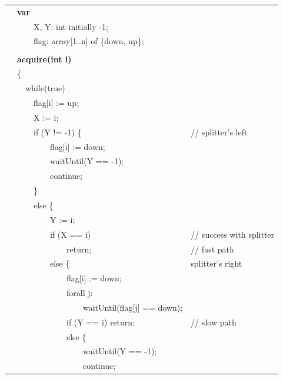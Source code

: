 \documentclass[twoside]{article}
\newcounter{magicrownumbers}
\newcommand\rownumber{\stepcounter{magicrownumbers}\arabic{magicrownumbers}}
\begin{document}
\begin{table}[!ht]
    \centering
    \begin{tabular}{l  l  l }
    \hline
        \rownumber & \textbf{var} \\ 
        \rownumber & \ \ \ \ X, Y: int initially -1; \\ 
        \rownumber & \ \ \ \ flag: array[1..n] of \{down, up\}; \\ 
        \rownumber  \\ 
        \rownumber & \textbf{acquire(int i)} \\ 
        \rownumber & \{ \\ 
        \rownumber & \ \ while(true) \\ 
        \rownumber & \ \ \ \ flag[i] := up; \\ 
        \rownumber & \ \ \ \ X := i; \\ 
        \rownumber & \ \ \ \ if (Y != -1) \{ & // splitter’s left \\ 
        \rownumber & \ \ \ \ \ \ \ \ flag[i] := down; \\ 
        \rownumber & \ \ \ \ \ \ \ \ waitUntil(Y == -1); \\ 
        \rownumber & \ \ \ \ \ \ \ \ continue; \\ 
        \rownumber & \ \ \ \ \} \\
        \rownumber & \ \ \ \ else \{ \\
        \rownumber & \ \ \ \ \ \ \ \ Y := i; \\
        \rownumber & \ \ \ \ \ \ \ \ if (X == i) & // success with splitter \\
        \rownumber & \ \ \ \ \ \ \ \ \ \ \ \ return; & // fast path \\
        \rownumber & \ \ \ \ \ \ \ \ else \{ & splitter's right \\
        \rownumber & \ \ \ \ \ \ \ \ \ \ \ \ flag[i] := down; \\
        \rownumber & \ \ \ \ \ \ \ \ \ \ \ \ forall j: \\
        \rownumber & \ \ \ \ \ \ \ \ \ \ \ \ \ \ \ \ waitUntil(flag[j] == down); \\
        \rownumber & \ \ \ \ \ \ \ \ \ \ \ \ if (Y == i) return; & // slow path \\
        \rownumber & \ \ \ \ \ \ \ \ \ \ \ \ else \{ \\
        \rownumber & \ \ \ \ \ \ \ \ \ \ \ \ \ \ \ \ waitUntil(Y == -1); \\
        \rownumber & \ \ \ \ \ \ \ \ \ \ \ \ \ \ \ \ continue; \\

\end{tabular}
\end{table}
\end{document}
